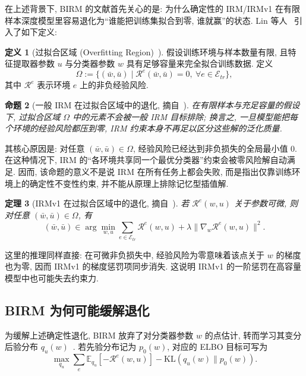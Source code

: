 \documentclass[a4paper,punct=banjiao,twoside]{ctexrep}
\theoremstyle{plain}
\newtheorem{thm}{定理}[chapter]
\newtheorem{prop}[thm]{命题}
\theoremstyle{definition}
\newtheorem{defn}[thm]{定义}
\theoremstyle{remark}
\begin{document}
在上述背景下, BIRM 的文献首先关心的是: 为什么确定性的 IRM/IRMv1 在有限样本深度模型里容易退化为“谁能把训练集拟合到零, 谁就赢”的状态. Lin 等人~\cite{lin2022bayesian} 引入了如下定义:

\begin{defn}[过拟合区域 (Overfitting Region)~\cite{lin2022bayesian}]
假设训练环境与样本数量有限, 且特征提取器参数 $u$ 与分类器参数 $w$ 具有足够容量来完全拟合训练数据. 定义
\begin{equation}
    \Omega := \{(\bar{w}, \bar{u}) \mid \mathcal{R}^e(\bar{w}, \bar{u}) = 0,\ \forall e \in \mathcal{E}_{tr}\},
\end{equation}
其中 $\mathcal{R}^e$ 表示环境 $e$ 上的非负经验风险.
\end{defn}

\begin{prop}[一般 IRM 在过拟合区域中的退化, 摘自~\cite{lin2022bayesian}]
\label{prop:irm_failure}
在有限样本与充足容量的假设下, 过拟合区域 $\Omega$ 中的元素不会被一般 IRM 目标排除; 换言之, 一旦模型能把每个环境的经验风险都压到零, IRM 约束本身不再足以区分这些解的泛化质量.
\end{prop}

其核心原因是: 对任意 $(\bar{w},\bar{u})\in\Omega$, 经验风险已经达到非负损失的全局最小值 $0$. 在这种情况下, IRM 的“各环境共享同一个最优分类器”约束会被零风险解自动满足. 因而, 该命题的意义不是说 IRM 在所有任务上都会失败, 而是指出仅靠训练环境上的确定性不变性约束, 并不能从原理上排除记忆型插值解.

\begin{thm}[IRMv1 在过拟合区域中的退化, 摘自~\cite{lin2022bayesian}]
\label{thm:irmv1_failure}
若 $\mathcal{R}^e(w,u)$ 关于参数可微, 则对任意 $(\bar{w},\bar{u})\in\Omega$, 有
\begin{equation}
    (\bar{w}, \bar{u}) \in \arg\min_{w,u} \sum_{e \in \mathcal{E}_{tr}} \mathcal{R}^e(w, u) + \lambda \|\nabla_w \mathcal{R}^e(w,u)\|^2.
\end{equation}
\end{thm}

这里的推理同样直接: 在可微非负损失中, 经验风险为零意味着该点关于 $w$ 的梯度也为零, 因而 IRMv1 的梯度惩罚项同步消失. 这说明 IRMv1 的一阶惩罚在高容量模型中也可能失去约束力.

\subsection{BIRM 为何可能缓解退化}

为缓解上述确定性退化, BIRM 放弃了对分类器参数 $w$ 的点估计, 转而学习其变分后验分布 $q_u(w)$~\cite{lin2022bayesian}. 若先验分布记为 $p_0(w)$, 对应的 ELBO 目标可写为
\begin{equation}
    \max_{q_u} \sum_e \mathbb{E}_{q_u}[-\mathcal{R}^e(w,u)] - \text{KL}(q_u(w)\|p_0(w)).
\end{equation}
\end{document}
